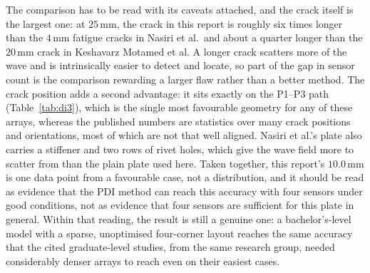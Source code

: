 \begin{table}[H]
\centering
\caption{Published PDI localisation errors compared against the result of Section~\ref{sec:stage2}.}
\label{tab:litcompare}
\end{table}

The comparison has to be read with its caveats attached, and the crack itself is the largest one: at $25$\,mm,
the crack in this report is roughly six times longer than the $4$\,mm fatigue cracks in Nasiri et al.\ and about a
quarter longer than the $20$\,mm crack in Keshavarz Motamed et al. A longer crack scatters more of the wave
and is intrinsically easier to detect and locate, so part of the gap in sensor count is the comparison rewarding
a larger flaw rather than a better method. The crack position adds a second advantage: it sits exactly on the
P1--P3 path (Table~\ref{tab:di3}), which is the single most favourable geometry for any of these arrays, whereas
the published numbers are statistics over many crack positions and orientations, most of which are not that
well aligned. Nasiri et al.'s plate also carries a stiffener and two rows of rivet holes, which give the wave field
more to scatter from than the plain plate used here. Taken together, this report's $10.0$\,mm is one data point
from a favourable case, not a distribution, and it should be read as evidence that the PDI method can reach
this accuracy with four sensors under good conditions, not as evidence that four sensors are sufficient for
this plate in general. Within that reading, the result is still a genuine one: a bachelor's-level model with a
sparse, unoptimised four-corner layout reaches the same accuracy that the cited graduate-level studies, from
the same research group, needed considerably denser arrays to reach even on their easiest cases.


